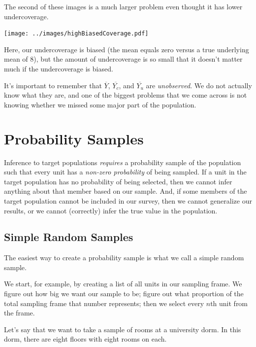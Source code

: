 \documentclass[11pt]{lecturenotes}
\begin{document}
The second of these images is a much larger problem even thought it has lower undercoverage. 

\begin{center}
\texttt{[image: ../images/highBiasedCoverage.pdf]}
\end{center}

\slide Here, our undercoverage is biased (the mean equals zero versus a true underlying mean of 8), but the amount of undercoverage is so small that it doesn't matter much if the undercoverage is biased. 

It's important to remember that $\overline{Y}$, $\overline{Y_c}$, and $\overline{Y_u}$ are \emph{unobserved}. We do not actually know what they are, and one of the biggest problems that we come across is not knowing whether we missed some major part of the population. 


\section{Probability Samples}
\slide
{}

Inference to target populations \emph{requires} a probability sample of the population such that every unit has a \emph{non-zero probability} of being sampled. If a unit in the target population has no probability of being selected, then we cannot infer anything about that member based on our sample. And, if some members of the target population cannot be included in our survey, then we cannot generalize our results, or we cannot (correctly) infer the true value in the population. 

\subsection[5]{Simple Random Samples}
The easiest way to create a probability sample is what we call a simple random sample. 

\slide
{}

\slide
We start, for example, by creating a list of all units in our sampling frame. We figure out how big we want our sample to be; figure out what proportion of the total sampling frame that number represents; then we select every $n$th unit from the frame. 

Let's say that we want to take a sample of rooms at a university dorm. In this dorm, there are eight floors with eight rooms on each. 
\end{document}
